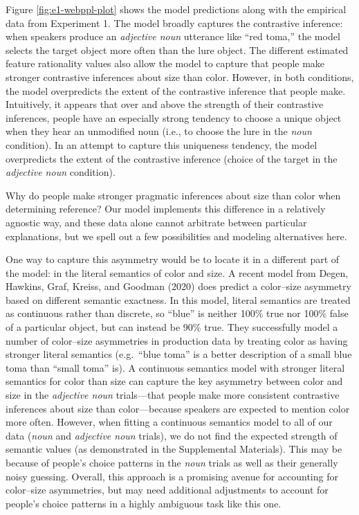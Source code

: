 \documentclass[
  english,
  man,floatsintext]{apa6}
\begin{document}
Figure \ref{fig:e1-webppl-plot} shows the model predictions along with the empirical data from Experiment 1. The model broadly captures the contrastive inference: when speakers produce an \emph{adjective noun} utterance like ``red toma,'' the model selects the target object more often than the lure object. The different estimated feature rationality values also allow the model to capture that people make stronger contrastive inferences about size than color. However, in both conditions, the model overpredicts the extent of the contrastive inference that people make. Intuitively, it appears that over and above the strength of their contrastive inferences, people have an especially strong tendency to choose a unique object when they hear an unmodified noun (i.e., to choose the lure in the \emph{noun} condition). In an attempt to capture this uniqueness tendency, the model overpredicts the extent of the contrastive inference (choice of the target in the \emph{adjective noun} condition).

Why do people make stronger pragmatic inferences about size than color when determining reference? Our model implements this difference in a relatively agnostic way, and these data alone cannot arbitrate between particular explanations, but we spell out a few possibilities and modeling alternatives here.

One way to capture this asymmetry would be to locate it in a different part of the model: in the literal semantics of color and size. A recent model from Degen, Hawkins, Graf, Kreiss, and Goodman (2020) does predict a color--size asymmetry based on different semantic exactness. In this model, literal semantics are treated as continuous rather than discrete, so ``blue'' is neither 100\% true nor 100\% false of a particular object, but can instead be 90\% true. They successfully model a number of color--size asymmetries in production data by treating color as having stronger literal semantics (e.g.~``blue toma'' is a better description of a small blue toma than ``small toma'' is). A continuous semantics model with stronger literal semantics for color than size can capture the key asymmetry between color and size in the \emph{adjective noun} trials---that people make more consistent contrastive inferences about size than color---because speakers are expected to mention color more often. However, when fitting a continuous semantics model to all of our data (\emph{noun} and \emph{adjective noun} trials), we do not find the expected strength of semantic values (as demonstrated in the Supplemental Materials). This may be because of people's choice patterns in the \emph{noun} trials as well as their generally noisy guessing. Overall, this approach is a promising avenue for accounting for color--size asymmetries, but may need additional adjustments to account for people's choice patterns in a highly ambiguous task like this one.
\end{document}

